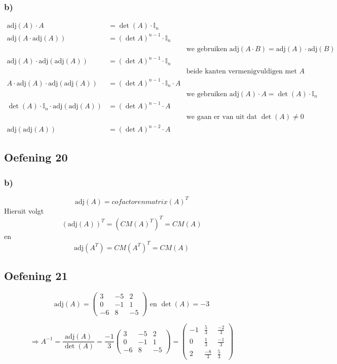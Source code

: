\documentclass[lineaire_algebra_oplossingen.tex]{subfiles}
\begin{document}
\subsubsection*{b)}
\begin{align*}
\text{adj}(A) \cdot A &= \det(A) \cdot \mathbb{I}_n \\
\text{adj}(A \cdot \text{adj}(A)) &= (\det A)^{n-1} \cdot \mathbb{I}_n \\
&&\text{we gebruiken $\text{adj}(A \cdot B) = \text{adj}(A) \cdot \text{adj}(B)$} \\
\text{adj}(A) \cdot \text{adj}(\text{adj}(A)) &= (\det A)^{n-1} \cdot \mathbb{I}_n \\
&&\text{beide kanten vermenigvuldigen met $A$} \\
A \cdot \text{adj}(A) \cdot \text{adj}(\text{adj}(A)) &= (\det A)^{n-1} \cdot \mathbb{I}_n \cdot A \\
&&\text{we gebruiken $\text{adj}(A) \cdot A = \det(A) \cdot \mathbb{I}_n$} \\
\det(A) \cdot \mathbb{I}_n \cdot \text{adj}(\text{adj}(A)) &= (\det A)^{n-1} \cdot A \\
&&\text{we gaan er van uit dat $\det(A) \neq 0$} \\
\text{adj}(\text{adj}(A)) &= (\det A)^{n-2} \cdot A
\end{align*}
\subsection{Oefening 20}
\subsubsection*{b)}
\[
\text{adj}(A) = \textit{cofactorenmatrix}(A)^T
\]
Hieruit volgt
\[
(\text{adj}(A))^T = (CM(A)^T)^T = CM(A)
\]
en
\[
\text{adj}(A^T) = CM(A^T)^T = CM(A)
\]
\subsection{Oefening 21}
\[\text{adj}(A) =
\begin{pmatrix}
3 & -5 & 2\\
0 & -1 & 1\\
-6 & 8 & -5
\end{pmatrix} 
\text{ en }
\det(A)=-3\]

\[
\Longrightarrow A^{-1} =
\frac{\text{adj}(A)}{\det(A)} =
\frac{-1}{3}
\begin{pmatrix}
3 & -5 & 2\\
0 & -1 & 1\\
-6 & 8 & -5
\end{pmatrix}
=
\begin{pmatrix}
-1 & \frac{5}{3}  & \frac{-2}{3} \\
0  & \frac{1}{3}  & \frac{-1}{3} \\
2  & \frac{-8}{3} & \frac{5}{3}
\end{pmatrix}
\]
\end{document}
